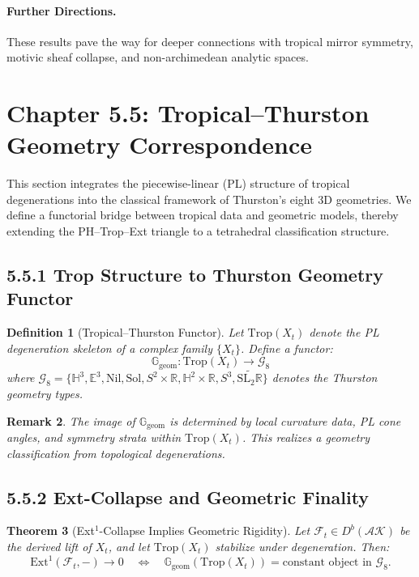 \documentclass[11pt]{article}
\newtheorem{theorem}{Theorem}[section]
\newtheorem{definition}[theorem]{Definition}
\newtheorem{remark}[theorem]{Remark}
\begin{document}
\paragraph{Further Directions.}
These results pave the way for deeper connections with tropical mirror symmetry, motivic sheaf collapse, and non-archimedean analytic spaces.

\section{Chapter 5.5: Tropical–Thurston Geometry Correspondence}
\label{sec:thurston}

This section integrates the piecewise-linear (PL) structure of tropical degenerations into the classical framework of Thurston’s eight 3D geometries. We define a functorial bridge between tropical data and geometric models, thereby extending the PH–Trop–Ext triangle to a tetrahedral classification structure.

\subsection{5.5.1 Trop Structure to Thurston Geometry Functor}

\begin{definition}[Tropical–Thurston Functor]
Let \( \mathrm{Trop}(X_t) \) denote the PL degeneration skeleton of a complex family \( \{X_t\} \). Define a functor:
\[
\mathbb{G}_\mathrm{geom} : \mathrm{Trop}(X_t) \longrightarrow \mathcal{G}_8
\]
where \( \mathcal{G}_8 = \{ \mathbb{H}^3, \mathbb{E}^3, \text{Nil}, \text{Sol}, S^2 \times \mathbb{R}, \mathbb{H}^2 \times \mathbb{R}, S^3, \widetilde{\text{SL}_2\mathbb{R}} \} \) denotes the Thurston geometry types.
\end{definition}

\begin{remark}
The image of \( \mathbb{G}_\mathrm{geom} \) is determined by local curvature data, PL cone angles, and symmetry strata within \( \mathrm{Trop}(X_t) \). This realizes a geometry classification from topological degenerations.
\end{remark}

\subsection{5.5.2 Ext-Collapse and Geometric Finality}

\begin{theorem}[Ext$^1$-Collapse Implies Geometric Rigidity]
Let \( \mathcal{F}_t \in D^b(\mathcal{AK}) \) be the derived lift of \( X_t \), and let \( \mathrm{Trop}(X_t) \) stabilize under degeneration. Then:
\[
\mathrm{Ext}^1(\mathcal{F}_t, -) \to 0 \quad \Longleftrightarrow \quad \mathbb{G}_\mathrm{geom}(\mathrm{Trop}(X_t)) = \text{constant object in } \mathcal{G}_8.
\]
\end{theorem}
\end{document}
